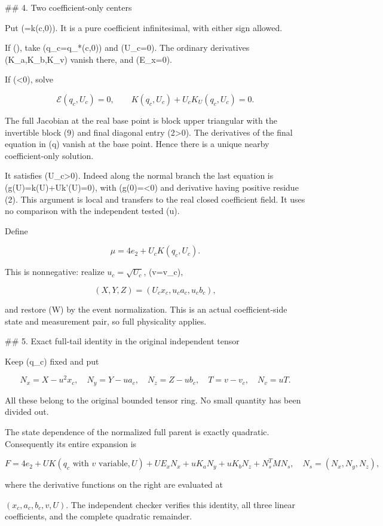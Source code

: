 ## 4. Two coefficient-only centers

Put (\kappa=k(c,0)). It is a pure coefficient infinitesimal, with either
sign allowed.

If (\kappa{}), take (q_c=q_*(c,0)) and (U_c=0). The ordinary
derivatives (K_a,K_b,K_v) vanish there, and (E_x=0).

If (\kappa<0), solve

\[
\mathcal E(q_c,U_c)=0,\qquad
K(q_c,U_c)+U_cK_U(q_c,U_c)=0.
\tag{11}
\]

The full Jacobian at the real base point is block upper triangular with
the invertible block (9) and final diagonal entry (2\gamma>0). The
derivatives of the final equation in (q) vanish at the base point.
Hence there is a unique nearby coefficient-only solution.

It satisfies (U_c>0). Indeed along the normal branch the last equation
is (g(U)=k(U)+Uk'(U)=0), with (g(0)=\kappa<0) and derivative having
positive residue (2\gamma). This argument is local and transfers to
the real closed coefficient field. It uses no comparison with the
independent tested (u).

Define

\[
\mu=4e_2+U_cK(q_c,U_c).
\tag{12}
\]

This is nonnegative: realize \(u_c=\sqrt{U_c}\), (v=v_c),

\[
(X,Y,Z)=(U_cx_c,u_ca_c,u_cb_c),
\]

and restore (W) by the event normalization. This is an actual
coefficient-side state and measurement pair, so full physicality applies.

## 5. Exact full-tail identity in the original independent tensor

Keep (q_c) fixed and put

\[
N_x=X-u^2x_c,\quad N_y=Y-ua_c,\quad N_z=Z-ub_c,
\quad T=v-v_c,\quad N_v=uT.
\tag{13}
\]

All these belong to the original bounded tensor ring. No small quantity
has been divided out.

The state dependence of the normalized full parent is exactly quadratic.
Consequently its entire expansion is

\[
F=4e_2+U K(q_c\text{ with }v\text{ variable},U)
+U E_xN_x+uK_aN_y+uK_bN_z+N_s^TMN_s,
\quad N_s=(N_x,N_y,N_z),
\tag{14}
\]

where the derivative functions on the right are evaluated at

\((x_c,a_c,b_c,v,U)\). The independent checker verifies this identity,
all three linear coefficients, and the complete quadratic remainder.


